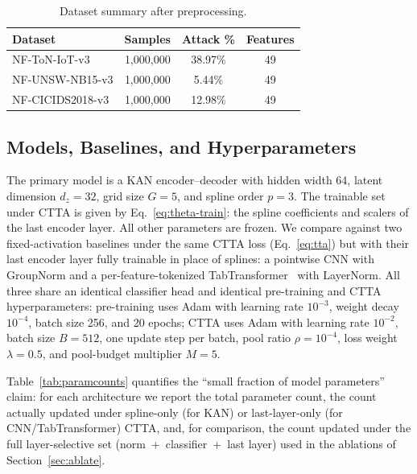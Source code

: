 \documentclass[10pt, conference, letterpaper]{IEEEtran}
\begin{document}
\begin{table}[h]
\centering
\caption{Dataset summary after preprocessing.}
\label{tab:datasets}
\begin{tabular}{lccc}
\toprule
\textbf{Dataset} & \textbf{Samples} & \textbf{Attack \%} & \textbf{Features} \\
\midrule
NF-ToN-IoT-v3    & 1,000,000 & 38.97\% & 49 \\
NF-UNSW-NB15-v3  & 1,000,000 & 5.44\%  & 49 \\
NF-CICIDS2018-v3 & 1,000,000 & 12.98\% & 49 \\
\bottomrule
\end{tabular}
\end{table}

\subsection{Models, Baselines, and Hyperparameters}

The primary model is a KAN encoder--decoder with hidden width 64, latent dimension $d_z = 32$, grid size $G = 5$, and spline order $p = 3$. The trainable set under CTTA is given by Eq.~\eqref{eq:theta-train}: the spline coefficients and scalers of the last encoder layer. All other parameters are frozen. We compare against two fixed-activation baselines under the same CTTA loss (Eq.~\eqref{eq:tta}) but with their last encoder layer fully trainable in place of splines: a pointwise CNN with GroupNorm and a per-feature-tokenized TabTransformer~\cite{huang2020tabtransformer, vaswani2017attention} with LayerNorm. All three share an identical classifier head and identical pre-training and CTTA hyperparameters: pre-training uses Adam with learning rate $10^{-3}$, weight decay $10^{-4}$, batch size 256, and 20 epochs; CTTA uses Adam with learning rate $10^{-2}$, batch size $B = 512$, one update step per batch, pool ratio $\rho = 10^{-4}$, loss weight $\lambda = 0.5$, and pool-budget multiplier $M = 5$.

Table~\ref{tab:paramcounts} quantifies the ``small fraction of model parameters'' claim: for each architecture we report the total parameter count, the count actually updated under spline-only (for KAN) or last-layer-only (for CNN/TabTransformer) CTTA, and, for comparison, the count updated under the full layer-selective set (norm~+~classifier~+~last layer) used in the ablations of Section~\ref{sec:ablate}.
\end{document}
